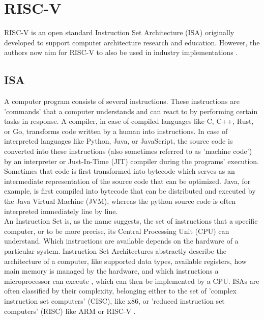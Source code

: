 
\section{RISC-V}

RISC-V \cite{riscv} is an open standard Instruction Set Architecture (ISA)
originally developed to support computer architecture research and education.
However, the authors now aim for RISC-V to also be used in industry implementations \cite[Cha 1]{riscv_spec}.

\subsection{ISA}

A computer program consists of several instructions.
These instructions are 'commands' that a computer understands and can react to by performing certain tasks in response.
A compiler, in case of compiled languages like C, C++, Rust, or Go, transforms code written by a human into instructions.
In case of interpreted languages like Python, Java, or JavaScript, the source code is converted into these instructions
(also sometimes referred to as 'machine code') by an interpreter or Just-In-Time (JIT) compiler during the programs' execution.
Sometimes that code is first transformed into bytecode which serves as an intermediate representation of the source code
that can be optimized.
Java, for example, is first compiled into bytecode that can be distributed and executed by the Java Virtual Machine (JVM),
whereas the python source code is often interpreted immediately line by line.
\\
An Instruction Set is, as the name suggests, the set of instructions that a specific computer, or to be more precise,
its Central Processing Unit (CPU) can understand.
Which instructions are available depends on the hardware of a particular system.
Instruction Set Architectures abstractly describe the architecture of a computer,
like supported data types, available registers, how main memory is managed by the hardware, and
which instructions a microprocessor can execute \cite{isa}, which can then be implemented by a CPU.
ISAs are often classified by their complexity, belonging either to the set of 'complex instruction set computers' (CISC), like x86,
or 'reduced instruction set computers' (RISC) like ARM \cite{arm_architecture} or RISC-V \cite{riscv_spec}.

